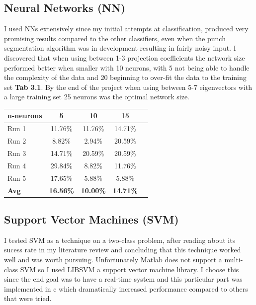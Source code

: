  \subsection{Neural Networks (NN)}
 I used NNs extensively since my initial attempts at classification, produced very promising results compared to the other classifiers, even when the punch segmentation algorithm was in development resulting in fairly noisy input. I discovered that when using between 1-3 projection coefficients the network size performed better when smaller with 10 neurons, with 5 not being able to handle the complexity of the data and 20 beginning to over-fit the data to the training set {\bf Tab 3.1}. By the end of the project when using between 5-7 eigenvectors with a large training set 25 neurons was the optimal network size.
\begin{table}[h]
\begin{center}
    \begin{tabular}{ | l | c  | c | c | c |}
    \hline
    n-neurons & 5 & 10 & 15\\ \hline
    Run 1 & 11.76\% & 11.76\% & 14.71\%\\ \hline
    Run 2 & 8.82\% & 2.94\% & 20.59\%\\ \hline
    Run 3 & 14.71\% & 20.59\% & 20.59\%\\ \hline
    Run 4 & 29.84\% & 8.82\% & 11.76\%\\ \hline
    Run 5 & 17.65\% & 5.88\% & 5.88\%\\ \hline
    \textbf{Avg} & \textbf{16.56\%} & \textbf{10.00\%} & \textbf{14.71\%}\\ \hline
    \end{tabular}
\end{center}
\end{table}

 \subsection{Support Vector Machines (SVM)}
I tested SVM as a technique on a two-class problem, after reading about its sucess rate in my literature review and concluding that this technique worked well and was worth pursuing. Unfortunately Matlab does not support a multi-class SVM so I used LIBSVM a support vector machine library. I choose this since the end goal was to have a real-time system and this particular part was implemented in c which dramatically increased performance compared to others that were tried. 

